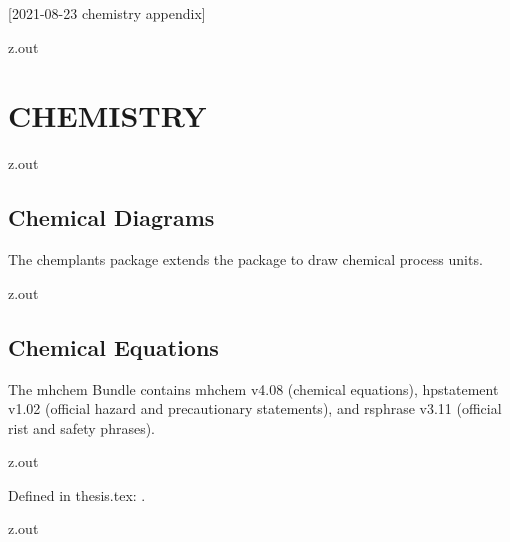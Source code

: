 [2021-08-23 chemistry appendix]

\begin{VerbatimOut}{z.out}
\chapter{CHEMISTRY}
\label{ch:chemistry}


\end{VerbatimOut}

\MyIO


\begin{VerbatimOut}{z.out}


\section{Chemical Diagrams}

The chemplants package \cite{feffin2019}
extends the
\href{http://ctan.math.washington.edu/tex-archive/graphics/pgf/base/doc/pgfmanual.pdf}{\TikZLogo} package
to draw chemical process units.
\end{VerbatimOut}

\MyIO


\begin{VerbatimOut}{z.out}


\section{Chemical Equations}

The mhchem Bundle \cite{hensel2018}
contains mhchem v4.08 (chemical equations),
hpstatement v1.02 (official hazard and precautionary statements),
and rsphrase v3.11 (official rist and safety phrases).
\end{VerbatimOut}

\MyIO


\begin{VerbatimOut}{z.out}

Defined in thesis.tex: \nitrate.
\end{VerbatimOut}

\MyIO


\begin{VerbatimOut}{z.out}

\end{VerbatimOut}

